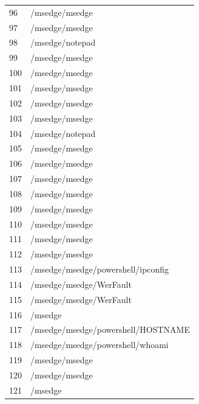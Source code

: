 \documentclass[a4paper,twoside,12pt]{book}
\begin{document}
\begin{appendices}
\begin{table}
\begin{tabular}{ll}
		96  &                                     /msedge/msedge \\
		97  &                                     /msedge/msedge \\
		98  &                                    /msedge/notepad \\
		99  &                                     /msedge/msedge \\
		100 &                                     /msedge/msedge \\
		101 &                                     /msedge/msedge \\
		102 &                                     /msedge/msedge \\
		103 &                                     /msedge/msedge \\
		104 &                                    /msedge/notepad \\
		105 &                                     /msedge/msedge \\
		106 &                                     /msedge/msedge \\
		107 &                                     /msedge/msedge \\
		108 &                                     /msedge/msedge \\
		109 &                                     /msedge/msedge \\
		110 &                                     /msedge/msedge \\
		111 &                                     /msedge/msedge \\
		112 &                                     /msedge/msedge \\
		113 &                 /msedge/msedge/powershell/ipconfig \\
		114 &                            /msedge/msedge/WerFault \\
		115 &                            /msedge/msedge/WerFault \\
		116 &                                            /msedge \\
		117 &                 /msedge/msedge/powershell/HOSTNAME \\
		118 &                   /msedge/msedge/powershell/whoami \\
		119 &                                     /msedge/msedge \\
		120 &                                     /msedge/msedge \\
		121 &                                            /msedge \\

\end{tabular}
\end{table}
\end{appendices}
\end{document}
